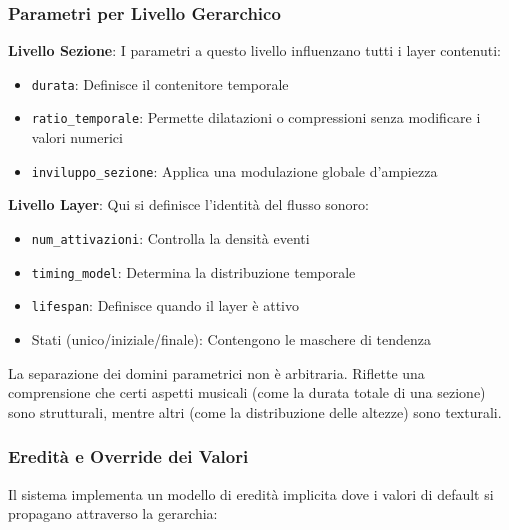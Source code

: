\subsubsection{Parametri per Livello Gerarchico}
\textbf{Livello Sezione}: I parametri a questo livello influenzano tutti i layer contenuti:
\begin{itemize}
    \item \texttt{durata}: Definisce il contenitore temporale
    \item \texttt{ratio\_temporale}: Permette dilatazioni o compressioni senza modificare i valori numerici
    \item \texttt{inviluppo\_sezione}: Applica una modulazione globale d'ampiezza
\end{itemize}

\textbf{Livello Layer}: Qui si definisce l'identità del flusso sonoro:
\begin{itemize}
    \item \texttt{num\_attivazioni}: Controlla la densità eventi
    \item \texttt{timing\_model}: Determina la distribuzione temporale
    \item \texttt{lifespan}: Definisce quando il layer è attivo
    \item Stati (unico/iniziale/finale): Contengono le maschere di tendenza
\end{itemize}

La separazione dei domini parametrici non è arbitraria. Riflette una comprensione che certi aspetti musicali (come la durata totale di una sezione) sono strutturali, mentre altri (come la distribuzione delle altezze) sono texturali.
\subsubsection{Eredità e Override dei Valori}
Il sistema implementa un modello di eredità implicita dove i valori di default si propagano attraverso la gerarchia:

